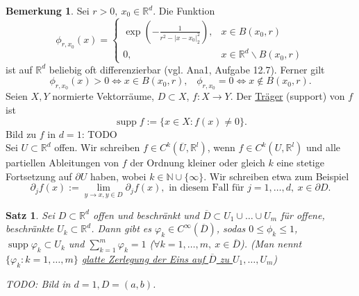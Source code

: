 \documentclass[a4paper]{report}
\newcommand{\R}{\mathbb{R}}
\newcommand{\N}{\mathbb{N}}
\newcommand{\jlabel}[1]{\label{j_#1}}
\newcommand{\jterm}[1]{\jlabel{#1}\uline{#1}}
\newcommand{\jabb}[3]{ #1: #2 \rightarrow #3 }
\newcommand{\jspace}{\vspace{8pt}}
\newcommand{\supp}{\mathop{\mathrm{{supp}}}}
\theoremstyle{plain}
\newtheorem{satz}[thm]{Satz}
\theoremstyle{definition}
\newtheorem{bem}[thm]{Bemerkung}
\begin{document}
{{{{\begin{bem}
    \jlabel{Bem 4.16}
    Sei $r>0, \ x_0 \in \R^d$. Die Funktion
    \[
        \phi_{r,x_0} (x) = \begin{cases}
                               \exp\left(-\frac{1}{r^2 - |x-x_0|_2^2} \right), &x\in B(x_0,r)\\
                               0, & x\in \R^d\backslash B(x_0,r)
                           \end{cases}
    \]
    ist auf $\R^d$ beliebig oft differenzierbar (vgl. Ana1, Aufgabe 12.7). Ferner gilt
    \[
        \phi_{r,x_0}(x) > 0 \Leftrightarrow x\in B(x_0,r), \hspace{10pt} \phi_{r,x_0} =0 \Leftrightarrow x\notin B(x_0,r).
    \]
    Seien $X,Y$ normierte Vektorräume, $D\subset X$, $\jabb{f}{X}{Y}$. Der \jterm{Träger} (support) von $f$ ist
    \[
        \supp f := \{x\in X : f(x) \ne 0\}.
    \]
    Bild zu $f$ in $d=1$: TODO\\
    Sei $U\subset \R^d$ offen. Wir schreiben $f\in C^k(\overline{U}, \R^l)$, wenn $f\in C^k(U, \R^l)$ und alle partiellen Ableitungen von $f$ der Ordnung kleiner oder gleich $k$ eine stetige Fortsetzung auf $\partial U$ haben, wobei $k\in\N \cup \{\infty\}$. Wir schreiben etwa zum Beispiel
    \[
        \partial_j f(x) := \lim_{y\rightarrow x, y\in D} \partial_j f(x), \text{ in diesem Fall für } j=1,\dots,d,\ x\in \partial D.
    \]
\end{bem}

\begin{satz}
    \jlabel{Satz 4.17}
    Sei $D\subset \R^d$ offen und beschränkt und $\overline{D}\subset U_1\cup\dots\cup U_m$ für offene, beschränkte $U_k\subset \R^d$. Dann gibt es $\varphi_k \in C^\infty(\overline{D})$, sodas $0\le \phi_k \le 1$, $\supp \varphi_k \subset U_k$ und $\sum_{k=1}^m \varphi_k = 1$ ($\forall k=1,\dots,m, \ x\in \overline{D}$). (Man nennt $\{\varphi_k : k=1,\dots,m\}$ \uline{glatte Zerlegung der Eins auf $\overline{D}$ zu $U_1,\dots,U_m$})
    
    \jspace
    
    TODO: Bild in $d=1, D=(a,b)$.
     

\end{satz}}}}}
\end{document}
